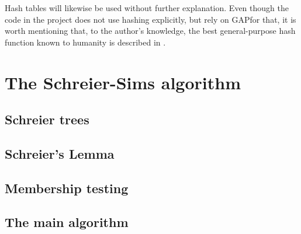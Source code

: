 \documentclass[draft]{amsart}
\theoremstyle{plain}
\theoremstyle{definition}
\theoremstyle{remark}
\newcommand{\GAP}{\textsf{GAP}}
\begin{document}
Hash tables will likewise be used without further explanation. Even
though the code in the project does not use hashing explicitly, but
rely on \GAP for that, it is worth mentioning that, to the author's
knowledge, the best general-purpose hash function known to humanity is
described in \cite{jenkins97}.

\section{The Schreier-Sims algorithm}

\subsection{Schreier trees}

\subsection{Schreier's Lemma}

\subsection{Membership testing}

\subsection{The main algorithm}



\end{document}
